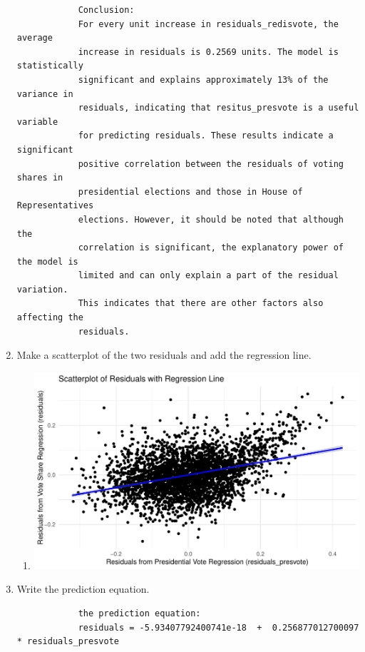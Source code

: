 \documentclass[12pt,letterpaper]{article}
\begin{document}
\begin{enumerate}
\begin{verbatim}
			Conclusion:
			For every unit increase in residuals_redisvote, the average 
			increase in residuals is 0.2569 units. The model is statistically 
			significant and explains approximately 13% of the variance in 
			residuals, indicating that resitus_presvote is a useful variable 
			for predicting residuals. These results indicate a significant 
			positive correlation between the residuals of voting shares in 
			presidential elections and those in House of Representatives 
			elections. However, it should be noted that although the 
			correlation is significant, the explanatory power of the model is 
			limited and can only explain a part of the residual variation. 
			This indicates that there are other factors also affecting the 
			residuals.
		\end{verbatim}
		\vspace{0cm}
		\item Make a scatterplot of the two residuals and add the regression line. 	
		
		\begin{enumerate}
			\item[]
			\includegraphics[width=.80\textwidth]{my_answers_question4.2_plot.pdf}
		\end{enumerate}
		\vspace{1cm}
		\item Write the prediction equation.
		
		\begin{verbatim}
			the prediction equation:
			residuals = -5.93407792400741e-18  +  0.256877012700097  * residuals_presvote
		\end{verbatim}
	\end{enumerate}
	
	\newpage	
\end{document}

